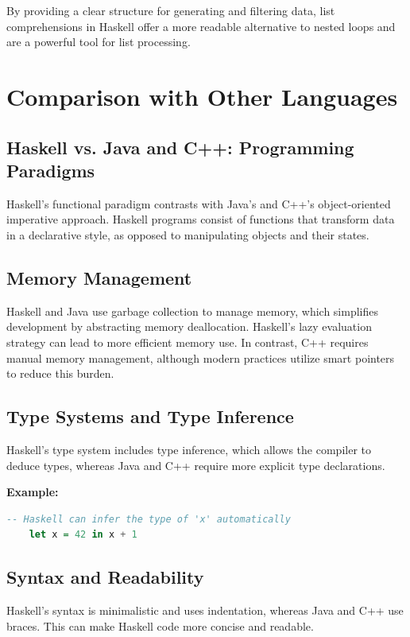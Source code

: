\documentclass[a4paper, 10pt]{article}
\begin{document}
            \noindent By providing a clear structure for generating and filtering data, list comprehensions in Haskell offer a more readable alternative to nested loops and are a powerful tool for list processing.
            \newpage

    \section{Comparison with Other Languages}

        \subsection{Haskell vs. Java and C++: Programming Paradigms}
        Haskell's functional paradigm contrasts with Java's and C++'s object-oriented imperative approach. Haskell programs consist of functions that transform data in a declarative style, as opposed to manipulating objects and their states.

        \subsection{Memory Management}
        Haskell and Java use garbage collection to manage memory, which simplifies development by abstracting memory deallocation. Haskell's lazy evaluation strategy can lead to more efficient memory use. In contrast, C++ requires manual memory management, although modern practices utilize smart pointers to reduce this burden.

        \subsection{Type Systems and Type Inference}
        Haskell's type system includes type inference, which allows the compiler to deduce types, whereas Java and C++ require more explicit type declarations.

        \textbf{Example:}
        \begin{lstlisting}[language=Haskell]
    -- Haskell can infer the type of 'x' automatically
    let x = 42 in x + 1
        \end{lstlisting}

        \subsection{Syntax and Readability}
        Haskell's syntax is minimalistic and uses indentation, whereas Java and C++ use braces. This can make Haskell code more concise and readable.
\end{document}
